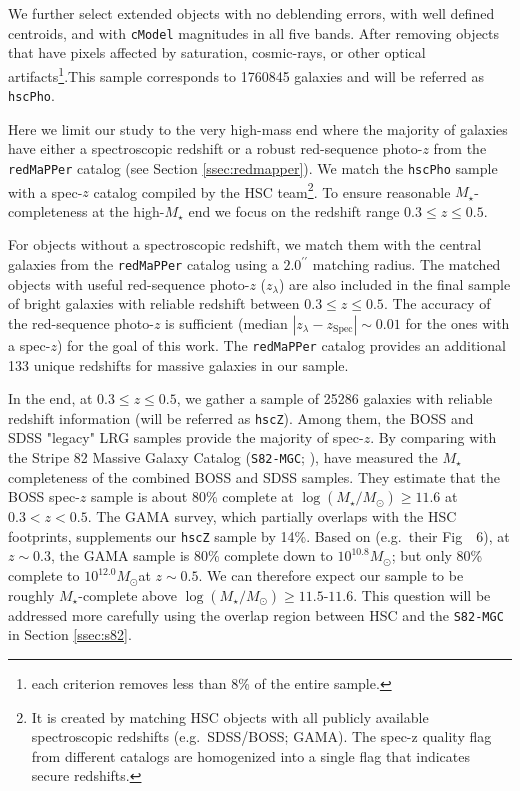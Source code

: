 \documentclass[a4paper,fleqn,usenatbib]{mnras}
\def\arcsec{{\prime\prime}}
\def\msun{$M_\odot$}
\def\redm{\texttt{redMaPPer}}
\def\mstar{{$M_{\star}$}}
\def\logms{{$\log (M_{\star}/M_{\odot})$}}
\begin{document}
    We further select extended objects with no deblending errors, with well defined 
    centroids, and with \texttt{cModel} magnitudes in all five bands. 
    After removing objects that have pixels affected by saturation, cosmic-rays, or 
    other optical artifacts\footnote{each criterion removes less than 8\% of the 
    entire sample.}.This sample corresponds to 1760845 galaxies and will be referred 
    as \texttt{hscPho}. 
        
    Here we limit our study to the very high-mass end where the majority of galaxies 
    have either a spectroscopic redshift or a robust red-sequence photo-$z$ from the 
    \redm{} catalog (see Section \ref{ssec:redmapper}).  
    We match the \texttt{hscPho} sample with a spec-$z$ catalog compiled by the HSC 
    team\footnote{It is created by matching HSC objects with all publicly available 
    spectroscopic redshifts (e.g.\ SDSS/BOSS; GAMA). The spec-z quality flag from 
    different catalogs are homogenized into a single flag that indicates secure 
    redshifts.}.  
    To ensure reasonable \mstar{}-completeness at the high-\mstar{} end we focus on
    the redshift range $0.3 \leq z \leq 0.5$. 
   
    For objects without a spectroscopic redshift, we match them with the central 
    galaxies from the \redm{} catalog using a $2.0^{\arcsec}$ matching radius. 
    The matched objects with useful red-sequence photo-$z$ ($z_{\lambda}$) are also 
    included in the final sample of bright galaxies with reliable redshift between 
    $0.3 \leq z \leq 0.5$. The accuracy of the red-sequence photo-$z$ is sufficient 
    (median $|z_{\lambda} - z_{\mathrm{Spec}}| \sim 0.01$ for the ones with a 
    spec-$z$) for the goal of this work.
    The \redm{} catalog provides an additional 133 unique redshifts for massive 
    galaxies in our sample.
        
    In the end, at $0.3 \leq z \leq 0.5$, we gather a sample of 25286 galaxies with 
    reliable redshift information (will be referred as \texttt{hscZ}).
    Among them, the BOSS and SDSS "legacy" LRG samples provide the majority of 
    spec-$z$. 
    By comparing with the Stripe 82 Massive Galaxy Catalog
    (\texttt{S82-MGC}; \citealt{Bundy2015}), \citet{Leauthaud2016} have measured the
    \mstar{} completeness of the combined BOSS and SDSS samples. 
    They estimate that the BOSS spec-$z$ sample is about 80\% complete at 
    \logms{}$\geq 11.6$ at $0.3 < z < 0.5$. 
    The GAMA survey, which partially overlaps with the HSC footprints, supplements 
    our \texttt{hscZ} sample by 14\%. 
    Based on \citet{Taylor2011} (e.g.\ their Fig~~6), at $z\sim 0.3$, the GAMA 
    sample is 80\% complete down to $10^{10.8}$\msun; but only 80\% complete to 
    $10^{12.0}$\msun at $z\sim 0.5$. 
    We can therefore expect our sample to be roughly \mstar{}-complete above 
    \logms{}$\geq 11.5$-$11.6$. 
    This question will be addressed more carefully using the overlap region between 
    HSC and the \texttt{S82-MGC} in Section \ref{ssec:s82}.
\end{document}
